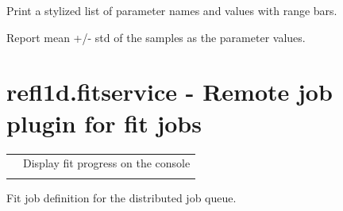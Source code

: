 \documentclass[letterpaper,10pt,english]{sphinxmanual}
\begin{document}

\begin{fulllineitems}
\label{api/fitproblem:refl1d.fitproblem.show_stats}
Print a stylized list of parameter names and values with range bars.

Report mean +/- std of the samples as the parameter values.

\end{fulllineitems}



\section{refl1d.fitservice - Remote job plugin for fit jobs}
\label{api/fitservice::doc}\label{api/fitservice:refl1d-fitservice-remote-job-plugin-for-fit-jobs}
\begin{tabulary}{\linewidth}{LL}
\hline

{\hyperref[api/fitservice:refl1d.fitservice.ServiceMonitor]{}}
 & 
Display fit progress on the console
\\

{\hyperref[api/fitservice:refl1d.fitservice.fitservice]{}}
 & 

\\
\hline
\end{tabulary}

\label{api/fitservice:module-refl1d.fitservice}
Fit job definition for the distributed job queue.
\end{document}
